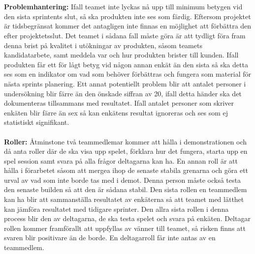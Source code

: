 \documentclass[10pt]{article}
\begin{document}
	\\\\
	\textbf{Problemhantering:} Ifall teamet inte lyckas nå upp till minimum betygen vid den sista sprintents slut, så ska produkten inte ses som färdig. Eftersom projektet är tidsbegränsat kommer det antagligen inte finnas en möjlighet att förbättra den efter projektetsslut. Det teamet i sådana fall måste göra är att tydligt föra fram denna brist på kvalitet i utökningar av produkten, såsom teamets kandidatarbete, samt meddela var och hur produkten brister till kunden.
	Ifall produkten får ett för lågt betyg vid någon annan enkät än den sista så ska detta ses som en indikator om vad som behöver förbättras och fungera som material för nästa sprints planering.
	Ett annat potentiellt problem blir att antalet personer i undersökning blir färre än den önskade siffran av 20, ifall detta händer ska det dokumenteras tillsammans med resultatet. Ifall antalet personer som skriver enkäten blir färre än sex så kan enkätens resultat ignoreras och ses som ej statistiskt signifikant.
	\\\\
	\textbf{Roller:} Åtminstone två teammedlemar kommer att hålla i demonstrationen och då anta roller där de ska visa upp spelet, förklara hur det fungera, starta upp en spel session samt svara på alla frågor deltagarna kan ha. En annan roll är att hålla i förarbetet såsom att mergea ihop de senaste stabila grenarna och göra ett urval av vad som inte borde tas med i demot. Denna person måste också testa den senaste builden så att den är sådana stabil. Den sista rollen en teammedlem kan ha blir att sammanställa resultatet av enkäterna så att teamet med lätthet kan jämföra resultatet med tidigare sprinter.	Den allra sista rollen i denna process blir den av deltagarna, de ska testa spelet och svara på enkäten. Deltagar rollen kommer framförallt att uppfyllas av vänner till teamet, så risken finns att svaren blir positivare än de borde. En deltagarroll får inte antas av en teammedlem.
	
	
\end{document}
